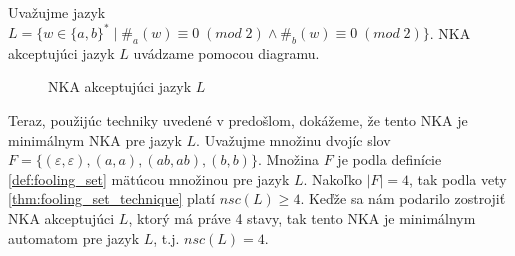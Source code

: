 \begin{example}
\normalfont Uvažujme jazyk $ L = \lbrace w \in \lbrace a,b \rbrace^* \; | \; \#_a(w) \equiv 0 \; (mod \; 2) \wedge \#_b(w) \equiv 0 \; (mod \; 2) \rbrace $. NKA akceptujúci jazyk $ L $ uvádzame pomocou diagramu.

\begin{figure}[H]
\centering
{}

\caption{NKA akceptujúci jazyk $ L $}
\end{figure}
Teraz, použijúc techniky uvedené v predošlom, dokážeme, že tento NKA je minimálnym NKA pre jazyk $ L $. Uvažujme množinu dvojíc slov $ F = \lbrace (\varepsilon, \varepsilon), (a,a), (ab,ab),(b,b) \rbrace $. Množina $ F $ je podla definície \ref{def:fooling_set} mätúcou množinou pre jazyk $ L $. Nakoľko $ |F| = 4 $, tak podla vety \ref{thm:fooling_set_technique} platí $ nsc(L) \geq 4 $. Keďže sa nám podarilo zostrojiť NKA akceptujúci $ L $, ktorý má práve 4 stavy, tak tento NKA je minimálnym automatom pre jazyk $ L $, t.j. $ nsc(L) = 4 $.
\end{example}

